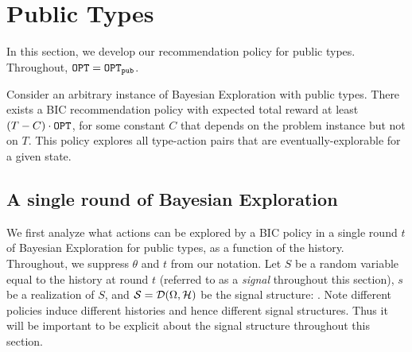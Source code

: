 
\section{Public Types}
\label{sec:public}

In this section, we develop our recommendation policy for public types. Throughout, $\mathtt{OPT} = \mathtt{OPT}_{\mathtt{pub}}$.

\begin{theorem}
\label{thm:public}
Consider an arbitrary instance of Bayesian Exploration with public types.
There exists a BIC recommendation policy with expected total reward at least $\left(T - C \right) \cdot \mathtt{OPT}$, for some constant $C$ that depends on the problem instance but not on $T$. This policy explores all type-action pairs that are eventually-explorable for a given state.
\end{theorem}

\subsection{A single round of Bayesian Exploration}
\label{sec:public_single}

We first analyze what actions can be explored by a BIC policy in a single round $t$ of Bayesian Exploration for public types, as a function of the history. Throughout, we suppress $\theta$ and $t$ from our notation.
Let $S$ be a random variable equal to the history at round $t$ (referred to as a {\em signal} throughout this section), $s$ be a realization of $S$, and $\mathcal{S}=\mathcal{D}(\Omega,\mathcal{H})$ be the signal structure: .  Note different policies induce different histories and hence different signal structures.  Thus it will be important to be explicit about the signal structure throughout this section.

%

